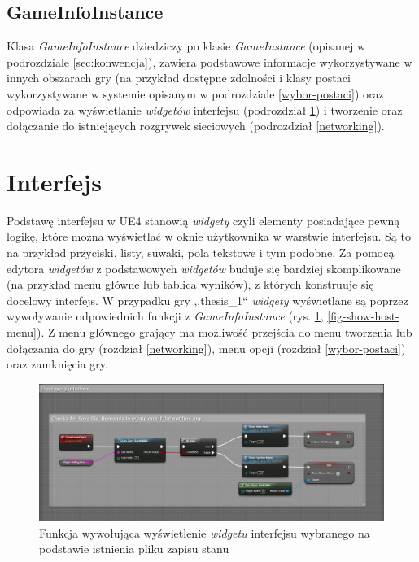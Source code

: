 \documentclass[multip]{SGGW-thesis}
\begin{document}
	\subsection{GameInfoInstance}
		\label{gameinfoinstance}
		Klasa {\em GameInfoInstance} dziedziczy po klasie {\em GameInstance} (opisanej w podrozdziale \ref{sec:konwencja}), zawiera podstawowe informacje wykorzystywane w innych obszarach gry (na przykład dostępne zdolności i klasy postaci wykorzystywane w systemie opisanym w podrozdziale \ref{wybor-postaci}) oraz odpowiada za wyświetlanie {\em widgetów} interfejsu (podrozdział \ref{interface}) i tworzenie oraz dołączanie do istniejących rozgrywek sieciowych (podrozdział \ref{networking}).
	

\section{Interfejs}
	\label{interface}
	Podstawę interfejsu w UE4 stanowią {\em widgety} czyli elementy posiadające pewną logikę, które można wyświetlać w oknie użytkownika w warstwie interfejsu. Są to na przykład przyciski, listy, suwaki, pola tekstowe i tym podobne. Za pomocą edytora {\em widgetów} z podstawowych {\em widgetów} buduje się bardziej skomplikowane (na przykład menu główne lub tablica wyników), z których konstruuje się docelowy interfejs.
	\newline
	\newline W przypadku gry ,,thesis\_1`` {\em widgety} wyświetlane są poprzez wywoływanie odpowiednich funkcji z {\em GameInfoInstance} (rys. \ref{fig-save-game-check}, \ref{fig-show-host-menu}). 
	\newline Z menu głównego grający ma możliwość przejścia do menu tworzenia lub dołączania do gry (rozdział \ref{networking}), menu opcji (rozdział \ref{wybor-postaci}) oraz zamknięcia gry.

	\begin{figure}
		\centering
			\includegraphics[width=1\textwidth]{figures/savegamecheck.jpg}
		\caption{Funkcja wywołująca wyświetlenie {\em widgetu} interfejsu wybranego na podstawie istnienia pliku zapisu stanu}
		\label{fig-save-game-check}
	\end{figure}
	
\end{document}
